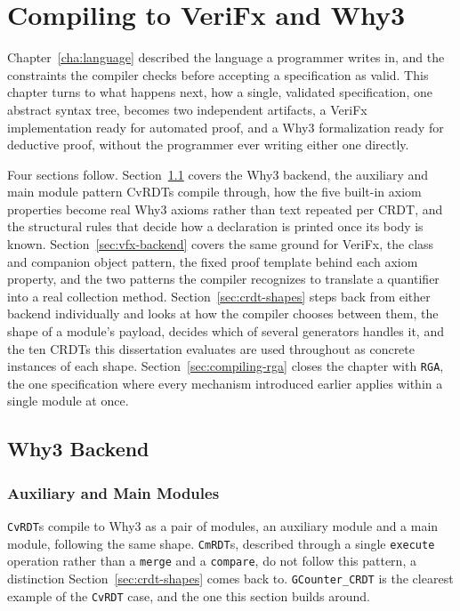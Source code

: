 
%

\chapter{Compiling to VeriFx and Why3}
\label{cha:compiling}

Chapter~\ref{cha:language} described the language a programmer writes in, and the constraints the compiler checks before
accepting a specification as valid. This chapter turns to what happens next, how a single, validated specification, one
abstract syntax tree, becomes two independent artifacts, a VeriFx implementation ready for automated proof, and a Why3
formalization ready for deductive proof, without the programmer ever writing either one directly.

Four sections follow. Section~\ref{sec:why3-backend} covers the Why3 backend, the auxiliary and main module pattern
CvRDTs compile through, how the five built-in axiom properties become real Why3 axioms rather than text repeated per
CRDT, and the structural rules that decide how a declaration is printed once its body is known.
Section~\ref{sec:vfx-backend} covers the same ground for VeriFx, the class and companion object pattern, the fixed proof
template behind each axiom property, and the two patterns the compiler recognizes to translate a quantifier into a real
collection method. Section~\ref{sec:crdt-shapes} steps back from either backend individually and looks at how the
compiler chooses between them, the shape of a module's payload, decides which of several generators handles it, and the ten CRDTs this dissertation
evaluates are used throughout as concrete instances of each shape. Section~\ref{sec:compiling-rga} closes the chapter
with \texttt{RGA}, the one specification where every mechanism introduced earlier applies within a single module at once.

\section{Why3 Backend}
\label{sec:why3-backend}

\subsection{Auxiliary and Main Modules}
\label{sub:w3-aux-main}

\texttt{CvRDT}s compile to Why3 as a pair of modules, an auxiliary module and a main module, following the same shape.
\texttt{CmRDT}s, described through a single \texttt{execute} operation rather than a \texttt{merge} and a
\texttt{compare}, do not follow this pattern, a distinction Section~\ref{sec:crdt-shapes} comes back to. \texttt{GCounter\_CRDT} is the
clearest example of the \texttt{CvRDT} case, and the one this section builds around.

